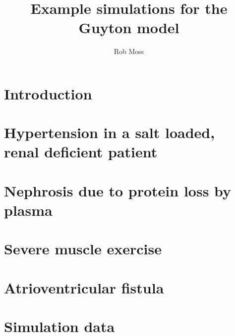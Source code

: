 \documentclass{scrartcl}
\begin{document}
  \title{Example simulations for the Guyton model}
  \author{Rob Moss}

  \maketitle

  \section{Introduction}
  

  \section{Hypertension in a salt loaded, renal deficient patient}
  

  \section{Nephrosis due to protein loss by plasma}
  

  \section{Severe muscle exercise}
  

  \section{Atrioventricular fistula}
  

  \section{Simulation data}
  

  \clearpage
  
\end{document}
